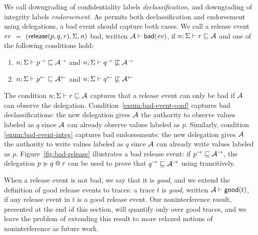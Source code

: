 We call downgrading of confidentiality labels \emph{declassification}, and downgrading of integrity labels \emph{endorsement}. As \lang{} permits both declassification and endorsement using delegations, a bad event should capture both cases. We call a release event $\event$ $=$ $(\mathsf{release}(p, q, r), \env, n)$ bad, written $\bad{\Attacker}{\event}$, if $\nopostflowstoquery{n; \env}{r}{\Attacker}$ and one of the following conditions hold:
\begin{enumerate}
    \item \label{enum:bad-event-conf} $\nopostflowstoquery{n; \env}{\conf{p}}{\conf{\Attacker}}$ and $\nopostnotflowstoquery{n; \env}{\conf{q}}{\conf{\Attacker}}$
    \item \label{enum:bad-event-integ} $\nopostflowstoquery{n; \env}{\integ{p}}{\integ{\Attacker}}$ and $\nopostnotflowstoquery{n; \env}{\integ{q}}{\integ{\Attacker}}$
\end{enumerate}
The condition $\nopostflowstoquery{n; \env}{r}{\Attacker}$ captures that a release event can only be bad if $\Attacker$ can observe the delegation. Condition~\ref{enum:bad-event-conf} captures bad declassifications: the new delegation gives $\Attacker$ the authority to observe values labeled as $q$ since $\Attacker$ can already observe values labeled as $p$. Similarly, condition \ref{enum:bad-event-integ} captures bad endorsements: the new delegation gives $\Attacker$ the authority to write values labeled as $q$ since $\Attacker$ can already write values labeled as $p$.
Figure~\ref{fig:bad-release} illustrates a bad release event: if $\conf{p} \flowsto \conf{\Attacker}$, the delegation $\lb{r}{p \actsfor q}$ can be used to prove that $\conf{q} \flowsto \conf{\Attacker}$ using transitively.

When a release event is not bad, we say that it is \emph{good}, and we extend the definition of good release events to traces: a trace $t$ is \emph{good}, written $\good{\Attacker}{t}$, if any release event in $t$ is a good release event. Our noninterference result, presented at the end of this section, will quantify only over good traces, and we leave the problem of extending this result to more relaxed notions of noninterference as future work.

